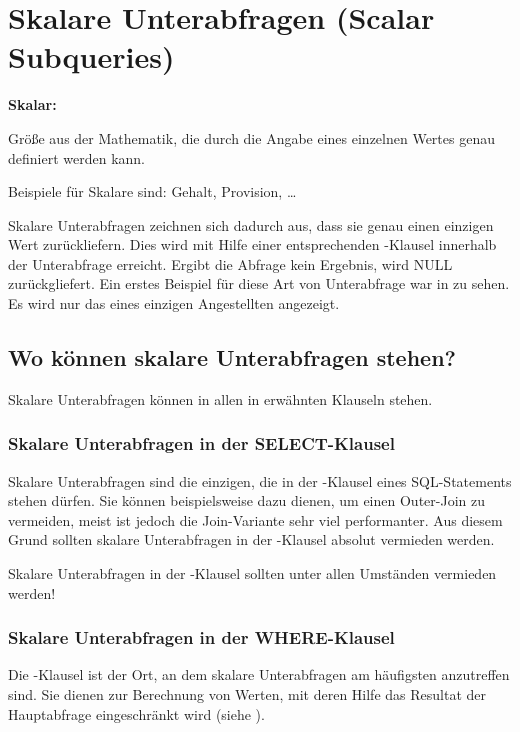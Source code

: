     \section{Skalare Unterabfragen (Scalar Subqueries)}
      \begin{merke}
        \textbf{Skalar:}
        \vspace{1em}

        Größe aus der Mathematik, die durch die Angabe eines einzelnen Wertes genau definiert werden kann.
        \vspace{1em}

        Beispiele für Skalare sind: Gehalt, Provision, \dots
      \end{merke}
      Skalare Unterabfragen zeichnen sich dadurch aus, dass sie genau einen einzigen Wert zurückliefern.   Dies wird mit Hilfe einer entsprechenden \WHERE-Klausel innerhalb der Unterabfrage erreicht. Ergibt die Abfrage kein Ergebnis, wird NULL zurückgliefert. Ein erstes Beispiel für diese Art von Unterabfrage war in  zu sehen. Es wird nur das  eines einzigen Angestellten angezeigt.
      \subsection{Wo können skalare Unterabfragen stehen?}
        Skalare Unterabfragen können in allen in  erwähnten Klauseln stehen.
        \subsubsection{Skalare Unterabfragen in der SELECT-Klausel}
          Skalare Unterabfragen sind die einzigen, die in der \SELECT-Klausel eines SQL-Statements stehen dürfen. Sie können beispielsweise dazu dienen, um einen Outer-Join zu vermeiden, meist ist jedoch die Join-Variante sehr viel performanter. Aus diesem Grund sollten skalare Unterabfragen in der \SELECT-Klausel absolut vermieden werden.

          \begin{merke}
            Skalare Unterabfragen in der \SELECT-Klausel sollten unter allen Umständen vermieden werden!
          \end{merke}
        \subsubsection{Skalare Unterabfragen in der WHERE-Klausel}
          Die \WHERE-Klausel ist der Ort, an dem skalare Unterabfragen am häufigsten anzutreffen sind. Sie dienen zur Berechnung von Werten, mit deren Hilfe das Resultat der Hauptabfrage eingeschränkt wird (siehe ).
